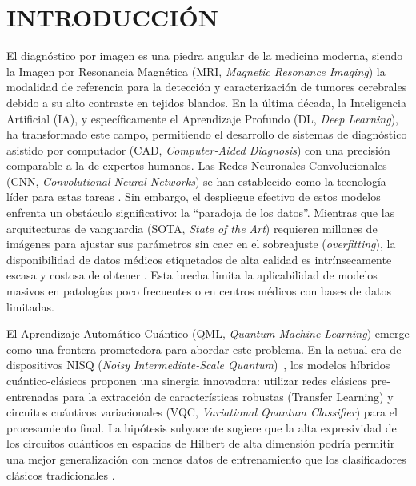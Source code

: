 \documentclass[12pt,letterpaper]{article}
\begin{document}
    \clearpage
    \hypersetup{pageanchor=true}

    \makeatletter
    \renewcommand{\cftdotsep}{10000}
    \makeatother

    \setlength{\cftfigindent}{0pt}
    \setlength{\cfttabindent}{0pt}

    \newpage
    \noindent\renewcommand{\contentsname}{\textbf{CONTENIDO}}
    \vspace{-1cm}
    {
        \hypersetup{linkcolor=black}
        \textbf{\tableofcontents}
    }

    \newpage
    \section*{INTRODUCCIÓN}
    \vspace{-0.5cm}

    El diagnóstico por imagen es una piedra angular de la medicina moderna, siendo la Imagen por Resonancia Magnética (MRI, \textit{Magnetic Resonance Imaging}) la modalidad de referencia para la detección y caracterización de tumores cerebrales debido a su alto contraste en tejidos blandos.
    En la última década, la Inteligencia Artificial (IA), y específicamente el Aprendizaje Profundo (DL, \textit{Deep Learning}), ha transformado este campo, permitiendo el desarrollo de sistemas de diagnóstico asistido por computador (CAD, \textit{Computer-Aided Diagnosis}) con una precisión comparable a la de expertos humanos.
    Las Redes Neuronales Convolucionales (CNN, \textit{Convolutional Neural Networks}) se han establecido como la tecnología líder para estas tareas \citep{he2016deep}.
    Sin embargo, el despliegue efectivo de estos modelos enfrenta un obstáculo significativo: la ``paradoja de los datos''.
    Mientras que las arquitecturas de vanguardia (SOTA, \textit{State of the Art}) requieren millones de imágenes para ajustar sus parámetros sin caer en el sobreajuste (\textit{overfitting}), la disponibilidad de datos médicos etiquetados de alta calidad es intrínsecamente escasa y costosa de obtener \citep{litjens2017survey, willemink2020preparing, esteva2019guide}. Esta brecha limita la aplicabilidad de modelos masivos en patologías poco frecuentes o en centros médicos con bases de datos limitadas.

    El Aprendizaje Automático Cuántico (QML, \textit{Quantum Machine Learning}) emerge como una frontera prometedora para abordar este problema.
    En la actual era de dispositivos NISQ (\textit{Noisy Intermediate-Scale Quantum})~\citep{Preskill2018,Bharti2022}, los modelos híbridos cuántico-clásicos proponen una sinergia innovadora: utilizar redes clásicas pre-entrenadas para la extracción de características robustas (Transfer Learning) y circuitos cuánticos variacionales (VQC, \textit{Variational Quantum Classifier}) para el procesamiento final.
    La hipótesis subyacente sugiere que la alta expresividad de los circuitos cuánticos en espacios de Hilbert de alta dimensión podría permitir una mejor generalización con menos datos de entrenamiento que los clasificadores clásicos tradicionales \citep{mari2020transfer, abbas2021power}.
\end{document}
